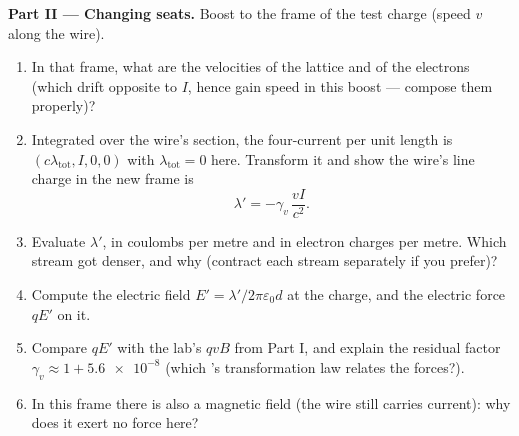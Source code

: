 \begin{problem}
\medskip\noindent\textbf{Part II --- Changing seats.}
Boost to the frame of the test charge (speed $v$ along the wire).
\begin{enumerate}[resume]
  \item In that frame, what are the velocities of the lattice and of
        the electrons (which drift opposite to $I$, hence gain speed
        in this boost --- compose them properly)?
  \item Integrated over the wire's section, the four-current per
        unit length is $(c\lambda_{\text{tot}}, I, 0, 0)$ with
        $\lambda_{\text{tot}} = 0$ here. Transform it and show the
        wire's line charge in the new frame is
        \[
        \lambda' = -\gamma_v\,\frac{vI}{c^2} .
        \]
  \item Evaluate $\lambda'$, in coulombs per metre and in electron
        charges per metre. Which stream got denser, and why
        (contract each stream separately if you prefer)?
  \item Compute the electric field $E' = \lambda'/2\pi\varepsilon_0d$
        at the charge, and the electric force $qE'$ on it.
  \item Compare $qE'$ with the lab's $qvB$ from Part I, and explain
        the residual factor $\gamma_v \approx 1 + \num{5.6e-8}$
        (which 's transformation law relates the forces?).
  \item In this frame there is also a magnetic field (the wire still
        carries current): why does it exert no force here?
\end{enumerate}


\end{problem}
